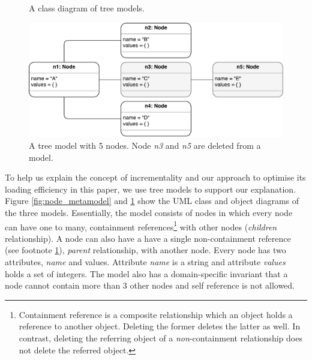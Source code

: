 \documentclass{llncs}
\begin{document}
\begin{figure}[ht]
\begin{minipage}[t]{0.39\linewidth}
    \centering
    \caption{A class diagram of tree models.}
    \label{fig:node_metamodel}
\end{minipage}
    \hfill
\begin{minipage}[t]{0.59\linewidth}
    \includegraphics[width=\linewidth]{initial_chart}
    \caption{A tree model with 5 nodes. Node \emph{n3} and \emph{n5} are deleted from a model.}
    \label{fig:initial_model}
\end{minipage} 
\end{figure}

To help us explain the concept of incrementality and our approach to optimise its loading efficiency in this paper, we use tree models to support our explanation.  Figure \ref{fig:node_metamodel} and \ref{fig:initial_model} show the UML class and object diagrams of the three models. Essentially, the model consists of nodes in which every node can have one to many, containment references\footnote{\label{fn:containment_reference}Containment reference is a composite relationship which an object holds a reference to another object. Deleting the former deletes the latter as well. In contrast, deleting the referring object of a \emph{non}-containment relationship does not delete the referred object.} with other nodes (\emph{children} relationship). A node can also have a have a single non-containment reference (see footnote \ref{fn:containment_reference}), \emph{parent} relationship, with another node. Every node has two attributes, \emph{name} and {values}. Attribute \emph{name} is a string and attribute \emph{values} holds a set of integers. The model also has a domain-specific invariant that a node cannot contain more than 3 other nodes and self reference is not allowed.
\end{document}

